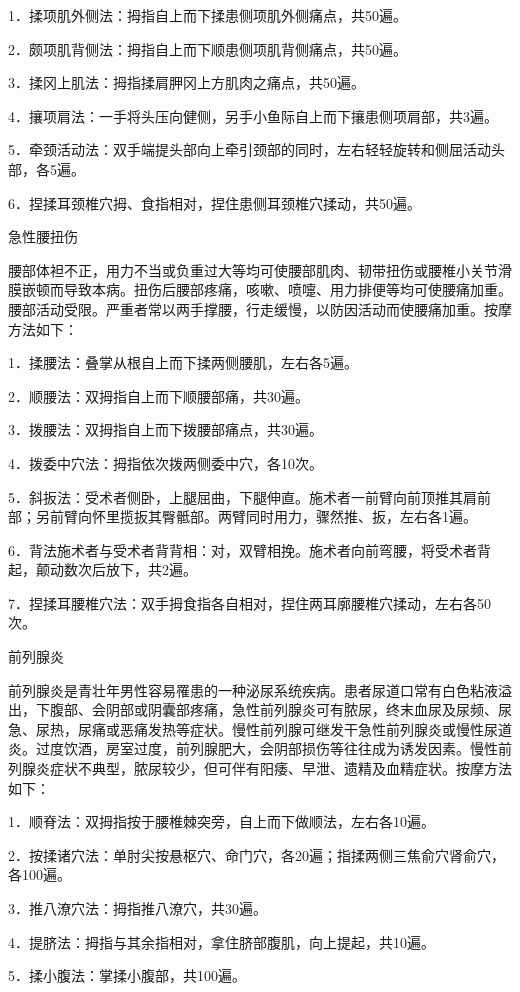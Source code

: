 \documentclass[12pt,UTF8]{ctexbook}
\begin{document}
1．揉项肌外侧法：拇指自上而下揉患侧项肌外侧痛点，共50遍。

2．颇项肌背侧法：拇指自上而下顺患侧项肌背侧痛点，共50遍。

3．揉冈上肌法：拇指揉肩胛冈上方肌肉之痛点，共50遍。

4．攘项肩法：一手将头压向健侧，另手小鱼际自上而下攘患侧项肩部，共3遍。

5．牵颈活动法：双手端提头部向上牵引颈部的同时，左右轻轻旋转和侧屈活动头部，各5遍。

6．捏揉耳颈椎穴拇、食指相对，捏住患侧耳颈椎穴揉动，共50遍。

急性腰扭伤

腰部体袒不正，用力不当或负重过大等均可使腰部肌肉、韧带扭伤或腰椎小关节滑膜嵌顿而导致本病。扭伤后腰部疼痛，咳嗽、喷嚏、用力排便等均可使腰痛加重。腰部活动受限。严重者常以两手撑腰，行走缓慢，以防因活动而使腰痛加重。按摩方法如下：

1．揉腰法：叠掌从根自上而下揉两侧腰肌，左右各5遍。

2．顺腰法：双拇指自上而下顺腰部痛，共30遍。

3．拨腰法：双拇指自上而下拨腰部痛点，共30遍。

4．拨委中穴法：拇指依次拨两侧委中穴，各10次。

5．斜扳法：受术者侧卧，上腿屈曲，下腿伸直。施术者一前臂向前顶推其肩前部；另前臂向怀里揽扳其臀骶部。两臂同时用力，骤然推、扳，左右各1遍。

6．背法施术者与受术者背背相：对，双臂相挽。施术者向前弯腰，将受术者背起，颠动数次后放下，共2遍。

7．捏揉耳腰椎穴法：双手拇食指各自相对，捏住两耳廓腰椎穴揉动，左右各50次。

前列腺炎

前列腺炎是青壮年男性容易罹患的一种泌尿系统疾病。患者尿道口常有白色粘液溢出，下腹部、会阴部或阴囊部疼痛，急性前列腺炎可有脓尿，终末血尿及尿频、尿急、尿热，尿痛或恶痛发热等症状。慢性前列腺可继发干急性前列腺炎或慢性尿道炎。过度饮酒，房室过度，前列腺肥大，会阴部损伤等往往成为诱发因素。慢性前列腺炎症状不典型，脓尿较少，但可伴有阳痿、早泄、遗精及血精症状。按摩方法如下：

1．顺脊法：双拇指按于腰椎棘突旁，自上而下做顺法，左右各10遍。

2．按揉诸穴法：单肘尖按悬枢穴、命门穴，各20遍；指揉两侧三焦俞穴肾俞穴，各100遍。

3．推八潦穴法：拇指推八潦穴，共30遍。

4．提脐法：拇指与其余指相对，拿住脐部腹肌，向上提起，共10遍。

5．揉小腹法：掌揉小腹部，共100遍。
\end{document}

